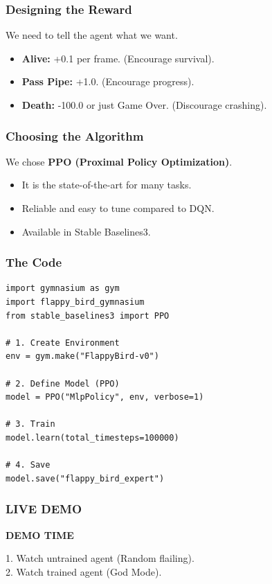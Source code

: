 \documentclass[aspectratio=169]{beamer}
\begin{document}
\begin{frame}
    \frametitle{Designing the Reward}
    We need to tell the agent what we want.
    \begin{itemize}
        \item \textbf{Alive:} +0.1 per frame. (Encourage survival).
        \item \textbf{Pass Pipe:} +1.0. (Encourage progress).
        \item \textbf{Death:} -100.0 or just Game Over. (Discourage crashing).
    \end{itemize}
\end{frame}

\begin{frame}
    \frametitle{Choosing the Algorithm}
    We chose \textbf{PPO (Proximal Policy Optimization)}.
    \begin{itemize}
        \item It is the state-of-the-art for many tasks.
        \item Reliable and easy to tune compared to DQN.
        \item Available in Stable Baselines3.
    \end{itemize}
\end{frame}

\begin{frame}[fragile]
    \frametitle{The Code}
    \begin{lstlisting}
import gymnasium as gym
import flappy_bird_gymnasium
from stable_baselines3 import PPO

# 1. Create Environment
env = gym.make("FlappyBird-v0")

# 2. Define Model (PPO)
model = PPO("MlpPolicy", env, verbose=1)

# 3. Train
model.learn(total_timesteps=100000)

# 4. Save
model.save("flappy_bird_expert")
    \end{lstlisting}
\end{frame}

\begin{frame}
    \frametitle{LIVE DEMO}
    \begin{center}
        \Huge \textbf{DEMO TIME}
        \vspace{1cm}

        \large
        1. Watch untrained agent (Random flailing).\\
        2. Watch trained agent (God Mode).
    \end{center}
\end{frame}
\end{document}
